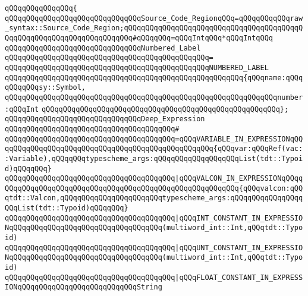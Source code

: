 \verb|qQQqqQQqqQQqqQQq{|\newline
\verb|qQQqqQQqqQQqqQQqqQQqqQQqqQQqqQQqSource_Code_RegionqQQq=qQQqqQQqqQQqraw_syntax::Source_Code_Region;qQQqqQQqqQQqqQQqqQQqqQQqqQQqqQQqqQQqqQQqqQQqqQQqqQQqqQQqqQQqqQQqqQQqqQQq#qQQqqQQq=qQQqIntqQQq*qQQqIntqQQq|\newline
\newline
\newline
\newline
\verb|qQQqqQQqqQQqqQQqqQQqqQQqqQQqqQQqNumbered_Label|\newline
\verb|qQQqqQQqqQQqqQQqqQQqqQQqqQQqqQQqqQQqqQQqqQQqqQQq=|\newline
\verb|qQQqqQQqqQQqqQQqqQQqqQQqqQQqqQQqqQQqqQQqqQQqqQQqNUMBERED_LABEL|\newline
\verb|qQQqqQQqqQQqqQQqqQQqqQQqqQQqqQQqqQQqqQQqqQQqqQQqqQQqqQQq{qQQqname:qQQqqQQqqQQqsy::Symbol,|\newline
\verb|qQQqqQQqqQQqqQQqqQQqqQQqqQQqqQQqqQQqqQQqqQQqqQQqqQQqqQQqqQQqqQQqnumber:qQQqInt|\newline
\verb|qQQqqQQqqQQqqQQqqQQqqQQqqQQqqQQqqQQqqQQqqQQqqQQqqQQqqQQq};|\newline
\newline
\newline
\newline
\verb|qQQqqQQqqQQqqQQqqQQqqQQqqQQqqQQqDeep_Expression|\newline
\verb|qQQqqQQqqQQqqQQqqQQqqQQqqQQqqQQqqQQqqQQq#|\newline
\verb|qQQqqQQqqQQqqQQqqQQqqQQqqQQqqQQqqQQqqQQq=qQQqVARIABLE_IN_EXPRESSIONqQQqqQQqqQQqqQQqqQQqqQQqqQQqqQQqqQQqqQQqqQQqqQQqqQQq{qQQqvar:qQQqRef(vac::Variable),qQQqqQQqtypescheme_args:qQQqqQQqqQQqqQQqqQQqList(tdt::Typoid)qQQqqQQq}|\newline
\verb|qQQqqQQqqQQqqQQqqQQqqQQqqQQqqQQqqQQqqQQq|\verb#|qQQqVALCON_IN_EXPRESSIONqQQqqQQqqQQqqQQqqQQqqQQqqQQqqQQqqQQqqQQqqQQqqQQqqQQqqQQqqQQq{qQQqvalcon:qQQqtdt::Valcon,qQQqqQQqqQQqqQQqqQQqqQQqtypescheme_args:qQQqqQQqqQQqqQQqqQQqList(tdt::Typoid)qQQqqQQq}#\newline
\verb|qQQqqQQqqQQqqQQqqQQqqQQqqQQqqQQqqQQqqQQq|\verb#|qQQqINT_CONSTANT_IN_EXPRESSIONqQQqqQQqqQQqqQQqqQQqqQQqqQQqqQQqqQQq(multiword_int::Int,qQQqtdt::Typoid)#\newline
\verb|qQQqqQQqqQQqqQQqqQQqqQQqqQQqqQQqqQQqqQQq|\verb#|qQQqUNT_CONSTANT_IN_EXPRESSIONqQQqqQQqqQQqqQQqqQQqqQQqqQQqqQQqqQQq(multiword_int::Int,qQQqtdt::Typoid)#\newline
\verb|qQQqqQQqqQQqqQQqqQQqqQQqqQQqqQQqqQQqqQQq|\verb#|qQQqFLOAT_CONSTANT_IN_EXPRESSIONqQQqqQQqqQQqqQQqqQQqqQQqqQQqString#\newline
